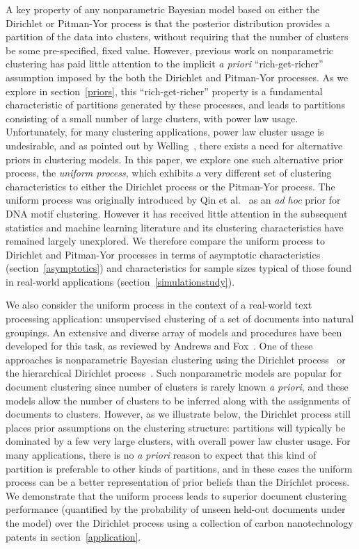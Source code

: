 \documentclass{article}
\begin{document}
A key property of any nonparametric Bayesian model based on either the
Dirichlet or Pitman-Yor process is that the posterior distribution
provides a partition of the data into clusters, without requiring that
the number of clusters be some pre-specified, fixed value.  However,
previous work on nonparametric clustering has paid little attention to
the implicit \emph{a priori} ``rich-get-richer'' assumption imposed by
the both the Dirichlet and Pitman-Yor processes. As we explore in
section~\ref{priors}, this ``rich-get-richer'' property is a
fundamental characteristic of partitions generated by these processes,
and leads to partitions consisting of a small number of large
clusters, with power law usage. Unfortunately, for many clustering
applications, power law cluster usage is undesirable, and as pointed
out by Welling~\cite{Wel06}, there exists a need for alternative
priors in clustering models. In this paper, we explore one such
alternative prior process, the \emph{uniform process}, which exhibits
a very different set of clustering characteristics to either the
Dirichlet process or the Pitman-Yor process. The uniform process was
originally introduced by Qin et al.~\cite{QinMcCTho03} as an \emph{ad
  hoc} prior for DNA motif clustering.  However it has received little
attention in the subsequent statistics and machine learning literature
and its clustering characteristics have remained largely
unexplored. We therefore compare the uniform process to Dirichlet and
Pitman-Yor processes in terms of asymptotic characteristics
(section~\ref{asymptotics}) and characteristics for sample sizes
typical of those found in real-world applications
(section~\ref{simulationstudy}).

We also consider the uniform process in the context of a real-world
text processing application: unsupervised clustering of a set of
documents into natural groupings.  An extensive and diverse array of
models and procedures have been developed for this task, as reviewed
by Andrews and Fox~\cite{AndFox07}.  One of these approaches is
nonparametric Bayesian clustering using the Dirichlet
process~\cite{ZhaGhaYan05} or the hierarchical Dirichlet
process~\cite{TehJorBea06}. Such nonparametric models are popular for
document clustering since number of clusters is rarely known \emph{a
  priori}, and these models allow the number of clusters to be
inferred along with the assignments of documents to clusters. However,
as we illustrate below, the Dirichlet process still places prior
assumptions on the clustering structure: partitions will typically be
dominated by a few very large clusters, with overall power law cluster
usage. For many applications, there is no \emph{a priori} reason to
expect that this kind of partition is preferable to other kinds of
partitions, and in these cases the uniform process can be a better
representation of prior beliefs than the Dirichlet process. We
demonstrate that the uniform process leads to superior document
clustering performance (quantified by the probability of unseen
held-out documents under the model) over the Dirichlet process using a
collection of carbon nanotechnology patents in section~\ref{application}.
\end{document}
